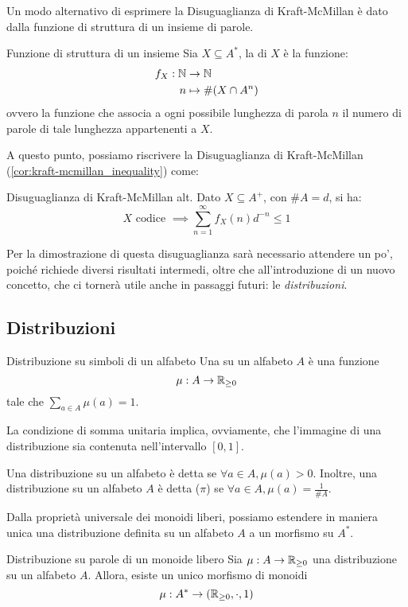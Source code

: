 Un modo alternativo di esprimere la Disuguaglianza di Kraft-McMillan è dato dalla funzione di struttura di un insieme di parole.
\begin{definition}{Funzione di struttura di un insieme}
  Sia \(X \subseteq A^*\), la  di \(X\) è la funzione:
  \begin{equation*}
    \begin{aligned}
      f_X: \mathbb{N} &\to \mathbb{N} \\
      n &\mapsto \#(X \cap A^n)
    \end{aligned}
  \end{equation*}
  ovvero la funzione che associa a ogni possibile lunghezza di parola \(n\) il numero di parole di tale lunghezza appartenenti a \(X\).
\end{definition}

A questo punto, possiamo riscrivere la Disuguaglianza di Kraft-McMillan (\ref{cor:kraft-mcmillan_inequality}) come:
\begin{corollary}[label=cor:kraft-mcmillan_inequality_alt]{Disuguaglianza di Kraft-McMillan alt.}
  Dato \(X \subseteq A^+\), con \(\# A = d\), si ha:
    \[X \text{ codice } \implies \sum_{n=1}^{\infty} f_X(n) d^{-n} \leq 1\]
\end{corollary}

Per la dimostrazione di questa disuguaglianza sarà necessario attendere un po', poiché richiede diversi risultati intermedi, oltre che all'introduzione di un nuovo concetto, che ci tornerà utile anche in passaggi futuri: le \emph{distribuzioni}.
\subsection{Distribuzioni}

\begin{definition}{Distribuzione su simboli di un alfabeto}
  Una  su un alfabeto \(A\) è una funzione
    \[\mu: A \to \mathbb{R}_{\geq 0}\]
  tale che \(\sum_{a \in A} \mu(a) = 1\).
\end{definition}
La condizione di somma unitaria implica, ovviamente, che l'immagine di una distribuzione sia contenuta nell'intervallo \([0,1]\).

Una distribuzione su un alfabeto è detta  se \(\forall a \in A, \mu(a) > 0\).
Inoltre, una distribuzione su un alfabeto \(A\) è detta  (\(\pi\)) se \(\forall a \in A, \mu(a) = \frac{1}{\# A}\).

Dalla proprietà universale dei monoidi liberi, possiamo estendere in maniera unica una distribuzione definita su un alfabeto \(A\) a un morfismo su \(A^*\).
\begin{definition}{Distribuzione su parole di un monoide libero}
  Sia \(\mu: A \to \mathbb{R}_{\geq 0}\) una distribuzione su un alfabeto \(A\).
  Allora, esiste un unico morfismo di monoidi
    \[\mu: A^* \to (\mathbb{R}_{\geq 0}, \cdot, 1)\]
\end{definition}

